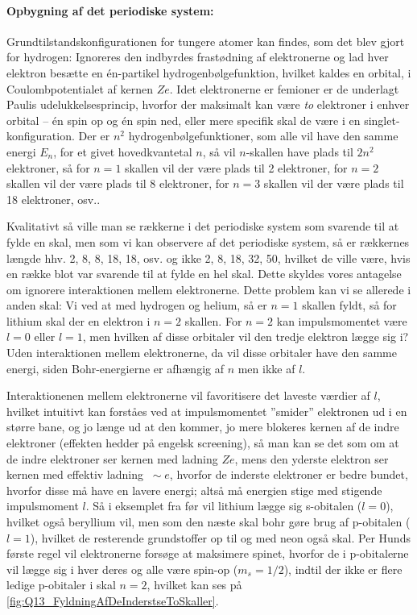 \paragraph{Opbygning af det periodiske system:} Grundtilstandskonfigurationen for tungere atomer kan findes, som det blev gjort for hydrogen: Ignoreres den indbyrdes frastødning af elektronerne og lad hver elektron besætte en én-partikel hydrogenbølgefunktion, hvilket kaldes en \textsf{orbital}, i Coulombpotentialet af kernen $Ze$. Idet elektronerne er femioner er de underlagt Paulis udelukkelsesprincip, hvorfor der maksimalt kan være \emph{to} elektroner i enhver orbital -- én spin op og én spin ned, eller mere specifik skal de være i en singlet-konfiguration. Der er $n^2$ hydrogenbølgefunktioner, som alle vil have den samme energi $E_n$, for et givet hovedkvantetal $n$, så vil $n$-skallen have plads til $2n^2$ elektroner, så for $n=1$ skallen vil der være plads til 2 elektroner, for $n=2$ skallen vil der være plads til 8 elektroner, for $n=3$ skallen vil der være plads til 18 elektroner, osv..

Kvalitativt så ville man se rækkerne i det periodiske system som svarende til at fylde en skal, men som vi kan observere af det periodiske system, så er rækkernes længde hhv. 2, 8, 8, 18, 18, osv. og ikke 2, 8, 18, 32, 50, hvilket de ville være, hvis en række blot var svarende til at fylde en hel skal. Dette skyldes vores antagelse om ignorere interaktionen mellem elektronerne. Dette problem kan vi se allerede i anden skal: Vi ved at med hydrogen og helium, så er $n=1$ skallen fyldt, så for lithium skal der en elektron i $n=2$ skallen. For $n=2$ kan impulsmomentet være $l=0$ eller $l=1$, men hvilken af disse orbitaler vil den tredje elektron lægge sig i? Uden interaktionen mellem elektronerne, da vil disse orbitaler have den samme energi, siden Bohr-energierne er afhængig af $n$ men ikke af $l$.

Interaktionenen mellem elektronerne vil favoritisere det laveste værdier af $l$, hvilket intuitivt kan forståes ved at impulsmomentet ''smider'' elektronen ud i en større bane, og jo længe ud at den kommer, jo mere blokeres kernen af de indre elektroner (effekten hedder på engelsk \textsf{screening}), så man kan se det som om at de indre elektroner ser kernen med ladning $Ze$, mens den yderste elektron ser kernen med effektiv ladning $\: \sim e$, hvorfor de inderste elektroner er bedre bundet, hvorfor disse må have en lavere energi; altså må energien stige med stigende impulsmoment $l$. Så i eksemplet fra før vil lithium lægge sig s-obitalen ($l=0$), hvilket også beryllium vil, men som den næste skal bohr gøre brug af p-obitalen ($l=1$), hvilket de resterende grundstoffer op til og med neon også skal. Per Hunds første regel vil elektronerne forsøge at maksimere spinet, hvorfor de i p-obitalerne vil lægge sig i hver deres og alle være spin-op ($m_s = 1/2$), indtil der ikke er flere ledige p-obitaler i skal $n=2$, hvilket kan ses på \cref{fig:Q13_FyldningAfDeInderstseToSkaller}.


